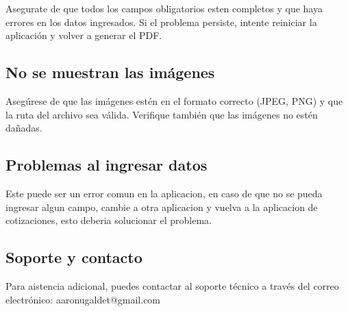 \documentclass{Pretexto/bluereport}
\begin{document}
Asegurate de que todos los campos obligatorios esten completos y que haya errores en los datos ingresados. Si el problema persiste, intente reiniciar la aplicación y volver a generar el PDF.

\subsection{No se muestran las imágenes}

Asegúrese de que las imágenes estén en el formato correcto (JPEG, PNG) y que la ruta del archivo sea válida. Verifique también que las imágenes no estén dañadas.

\subsection{Problemas al ingresar datos}

Este puede ser un error comun en la aplicacion, en caso de que no se pueda ingresar algun campo, cambie a otra aplicacion y vuelva a la aplicacion de cotizaciones, esto deberia solucionar el problema.

\subsection{Soporte y contacto}

Para aistencia adicional, puedes contactar al soporte técnico a través del correo electrónico: aaronugaldet@gmail.com
\pagebreak
\end{document}
